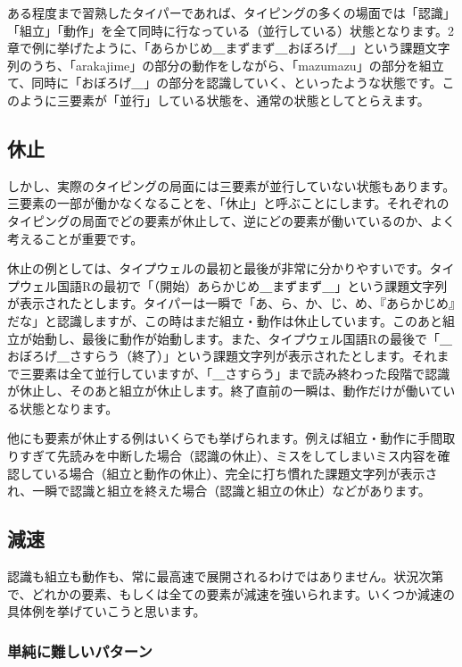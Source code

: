ある程度まで習熟したタイパーであれば、タイピングの多くの場面では「認識」「組立」「動作」を全て同時に行なっている（並行している）状態となります。2章で例に挙げたように、「あらかじめ＿まずまず＿おぼろげ＿」という課題文字列のうち、「arakajime」の部分の動作をしながら、「mazumazu」の部分を組立て、同時に「おぼろげ＿」の部分を認識していく、といったような状態です。このように三要素が「並行」している状態を、通常の状態としてとらえます。

\subsection{休止}

しかし、実際のタイピングの局面には三要素が並行していない状態もあります。三要素の一部が働かなくなることを、「休止」と呼ぶことにします。それぞれのタイピングの局面でどの要素が休止して、逆にどの要素が働いているのか、よく考えることが重要です。

休止の例としては、タイプウェルの最初と最後が非常に分かりやすいです。タイプウェル国語Rの最初で「（開始）あらかじめ＿まずまず＿」という課題文字列が表示されたとします。タイパーは一瞬で「あ、ら、か、じ、め、『あらかじめ』だな」と認識しますが、この時はまだ組立・動作は休止しています。このあと組立が始動し、最後に動作が始動します。また、タイプウェル国語Rの最後で「＿おぼろげ＿さすらう（終了）」という課題文字列が表示されたとします。それまで三要素は全て並行していますが、「＿さすらう」まで読み終わった段階で認識が休止し、そのあと組立が休止します。終了直前の一瞬は、動作だけが働いている状態となります。

他にも要素が休止する例はいくらでも挙げられます。例えば組立・動作に手間取りすぎて先読みを中断した場合（認識の休止）、ミスをしてしまいミス内容を確認している場合（組立と動作の休止）、完全に打ち慣れた課題文字列が表示され、一瞬で認識と組立を終えた場合（認識と組立の休止）などがあります。

\subsection{減速}

認識も組立も動作も、常に最高速で展開されるわけではありません。状況次第で、どれかの要素、もしくは全ての要素が減速を強いられます。いくつか減速の具体例を挙げていこうと思います。

\subsubsection*{単純に難しいパターン}

